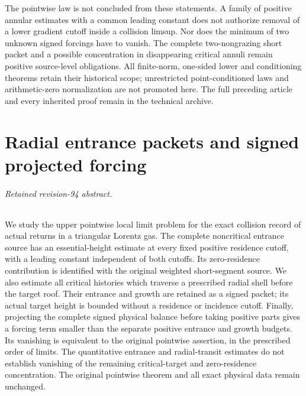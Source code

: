 \documentclass[11pt,reqno]{amsart}
\numberwithin{equation}{section}
\theoremstyle{definition}\newtheorem{definition}[theorem]{Definition}
\theoremstyle{remark}\newtheorem{remark}[theorem]{Remark}
\theoremstyle{definition}\newtheorem{inputstatement}[theorem]{Input statement}
\begin{document}
The pointwise law is not concluded from these statements. A family
of positive annular estimates with a common leading constant does
not authorize removal of a lower gradient cutoff inside a collision
limsup. Nor does the minimum of two unknown signed forcings have to
vanish. The complete two-nongrazing short packet and a possible
concentration in disappearing critical annuli remain positive
source-level obligations. All finite-norm, one-sided lower and
conditioning theorems retain their historical scope; unrestricted
point-conditioned laws and arithmetic-zero normalization are not
promoted here. The full preceding article and every inherited proof
remain in the technical archive.

\appendix


\endgroup
\part{Radial entrance packets and signed projected forcing}
\begingroup
\let\ArchiveLabel\label
\let\ArchiveRef\ref
\renewcommand{\label}[1]{\ArchiveLabel{v94archive:#1}}
\renewcommand{\ref}[1]{%
  \IfBeginWith{#1}{supp-}{%
    \StrBehind{#1}{supp-}[\ArchiveTarget]%
    \ArchiveRef{\ArchiveTarget}%
  }{\ArchiveRef{v94archive:#1}}%
}
\makeatletter
\let\ltx@label\label
\makeatother
\paragraph{Retained revision-94 abstract.}

We study the upper pointwise local limit problem for the exact collision
record of actual returns in a triangular Lorentz gas. The complete
noncritical entrance source has an essential-height estimate at every
fixed positive residence cutoff, with a leading constant independent
of both cutoffs. Its zero-residence contribution is identified with
the original weighted short-segment source. We also estimate all
critical histories which traverse a prescribed radial shell before
the target roof. Their entrance and growth are retained as a signed
packet; its actual target height is bounded without a residence or
incidence cutoff. Finally, projecting the complete signed physical
balance before taking positive parts gives a forcing term smaller
than the separate positive entrance and growth budgets. Its vanishing
is equivalent to the original pointwise assertion, in the prescribed
order of limits. The quantitative entrance and radial-transit estimates
do not establish vanishing of the remaining critical-target and
zero-residence concentration. The original pointwise theorem and all
exact physical data remain unchanged.
\end{document}
